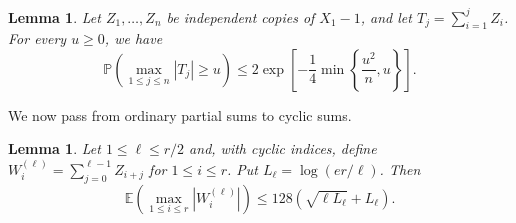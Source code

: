 \documentclass[10pt,a4paper]{amsart}
\numberwithin{equation}{section}
\newtheorem{lemma}[theorem]{Lemma}
\begin{document}
\begin{lemma}\label{lem:partial-max}
Let $Z_1,\ldots,Z_n$ be independent copies of $X_1-1$, and let $T_j=\sum_{i=1}^jZ_i$.  For every $u\ge0$, we have
\begin{equation}\label{eq:partial-tail}
 \mathbb{P}\left(\max_{1\le j\le n}|T_j|\ge u\right)
 \le 2\exp\left[-\frac14\min\left\{\frac{u^2}{n},u\right\}\right].
\end{equation}
\end{lemma}

We now pass from ordinary partial sums to cyclic sums.

\begin{lemma}\label{lem:scan}
Let $1\le\ell\le r/2$ and, with cyclic indices, define
$W_i^{(\ell)}=\sum_{j=0}^{\ell-1}Z_{i+j}$ for $1\le i\le r$.  Put
$L_\ell=\log(er/\ell)$.  Then
\begin{equation}\label{eq:scan-expectation}
 \mathbb{E}\left(\max_{1\le i\le r}|W_i^{(\ell)}|\right)
 \le 128\left(\sqrt{\ell L_\ell}+L_\ell\right).
\end{equation}
\end{lemma}
\end{document}
